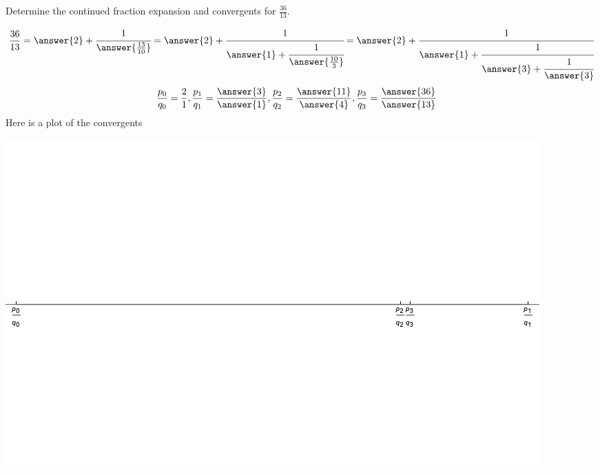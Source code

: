 \documentclass{ximera}
\begin{document}
\begin{example}
 Determine the continued fraction expansion and convergents for $\frac{36}{13}$. 
 
\begin{align*}
 \frac{36}{13}=\answer{2}+\cfrac{1}{\answer{\frac{13}{10}}}=\answer{2}+\cfrac{1}{\answer{1}+\cfrac{1}{\answer{\frac{10}{3}}}}=\answer{2}+\cfrac{1}{\answer{1}+\cfrac{1}{\answer{3}+\cfrac{1}{\answer{3}}}}
\end{align*}
\begin{align*}
  \frac{p_0}{q_0}&=\frac{2}{1}, \frac{p_1}{q_1}=\frac{\answer{3}}{\answer{1}},\frac{p_2}{q_2}=\frac{\answer{11}}{\answer{4}}, \frac{p_3}{q_3}=\frac{\answer{36}}{\answer{13}}\end{align*}
Here is a plot of the convergents
\begin{image}
 \includegraphics{example0}
\end{image}
\end{example}
\end{document}
